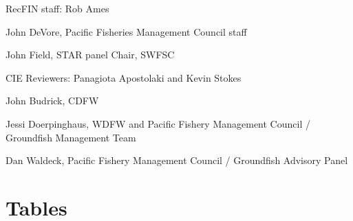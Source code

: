 \documentclass[12pt,]{article}
\begin{document}
RecFIN staff: Rob Ames

John DeVore, Pacific Fisheries Management Council staff

John Field, STAR panel Chair, SWFSC

CIE Reviewers: Panagiota Apostolaki and Kevin Stokes

John Budrick, CDFW

Jessi Doerpinghaus, WDFW and Pacific Fishery Management Council /
Groundfish Management Team

Dan Waldeck, Pacific Fishery Management Council / Groundfish Advisory
Panel

\newpage

\renewcommand{\thefigure}{\arabic{figure}}
\renewcommand{\thetable}{\arabic{table}}

\setcounter{figure}{0} \setcounter{table}{0} \newpage

\captionsetup[table]{labelformat=simple,format=plain,labelsep=period}

\section{Tables}\label{tables}
\end{document}
